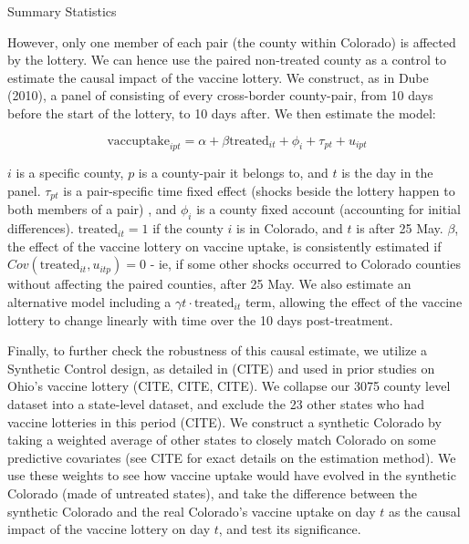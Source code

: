 \documentclass[12pt]{article}
\begin{document}
\begin{spacing}{1.5}
		\begin{table}
			\centering
			\caption{Summary Statistics}
			\centerline{}
			\label{table:didsummary}
		\end{table}
		
		However, only one member of each pair (the county within Colorado) is affected by the lottery. We can hence use the paired non-treated county as a control to estimate the causal impact of the vaccine lottery. We construct, as in Dube (2010), a panel of consisting of every cross-border county-pair, from 10 days before the start of the lottery, to 10 days after. We then estimate the model:
		
		\begin{equation} \label{eq:pairdesign}
			\textrm{vaccuptake}_{ipt} = \alpha + \beta \textrm{treated}_{it} + \phi_i + \tau_{pt} + u_{ipt}
		\end{equation}
		
		$i$ is a specific county, $p$ is a county-pair it belongs to, and $t$ is the day in the panel. $\tau_{pt}$ is a pair-specific time fixed effect (shocks beside the lottery happen to both members of a pair) , and $\phi_i$ is a county fixed account (accounting for initial differences). $\textrm{treated}_{it}=1$ if the county $i$ is in Colorado, and $t$ is after 25 May. $\beta$, the effect of the vaccine lottery on vaccine uptake, is consistently estimated if $Cov(\textrm{treated}_{it}, u_{itp})=0$ - ie, if some other shocks occurred to Colorado counties without affecting the paired counties, after 25 May. We also estimate an alternative model including a $\gamma t\cdot\textrm{treated}_{it}$ term, allowing the effect of the vaccine lottery to change linearly with time over the 10 days post-treatment.
		
		Finally, to further check the robustness of this causal estimate, we utilize a Synthetic Control design, as detailed in (CITE) and used in prior studies on Ohio's vaccine lottery (CITE, CITE, CITE). We collapse our 3075 county level dataset into a state-level dataset, and exclude the 23 other states who had vaccine lotteries in this period (CITE). We construct a synthetic Colorado by taking a weighted average of other states to closely match Colorado on some predictive covariates (see CITE for exact details on the estimation method). We use these weights to see how vaccine uptake would have evolved in the synthetic Colorado (made of untreated states), and take the difference between the synthetic Colorado and the real Colorado's vaccine uptake on day $t$ as the causal impact of the vaccine lottery on day $t$, and test its significance.
		

\end{spacing}
\end{document}
